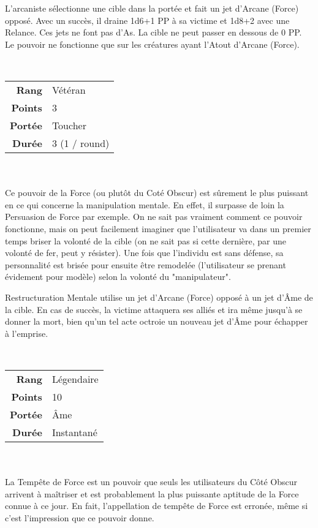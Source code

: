 \begin{description}[align=left]
        L’arcaniste sélectionne une cible dans la portée et fait un jet d’Arcane (Force) opposé. Avec un succès, il draine 1d6+1 PP à sa victime et 1d8+2 avec une Relance. Ces jets ne font pas d’As. La cible ne peut passer en dessous de 0 PP. Le pouvoir ne fonctionne que sur les créatures ayant l’Atout d’Arcane (Force).
        \\

    \item [Restructuration Mentale] ~ \\

        \begin{tabular}{ r l }
            \textbf{Rang}    & Vétéran \\
            \textbf{Points}  & 3 \\
            \textbf{Portée}  & Toucher \\
            \textbf{Durée}   & 3 (1 / round) \\
        \end{tabular}
        \\ \\
        Ce pouvoir de la Force (ou plutôt du Coté Obscur) est sûrement le plus puissant en ce qui concerne la manipulation mentale. En effet, il surpasse de loin la Persuasion de Force par exemple. On ne sait pas vraiment comment ce pouvoir fonctionne, mais on peut facilement imaginer que l’utilisateur va dans un premier temps briser la volonté de la cible (on ne sait pas si cette dernière, par une volonté de fer, peut y résister). Une fois que l’individu est sans défense, sa personnalité est brisée pour ensuite être remodelée (l’utilisateur se prenant évidement pour modèle) selon la volonté du "manipulateur". 

        Restructuration Mentale utilise un jet d’Arcane (Force) opposé à un jet d’\^Ame de la cible. En cas de succès, la victime attaquera ses alliés et ira même jusqu’à se donner la mort, bien qu’un tel acte octroie un nouveau jet d’\^Ame pour échapper à l’emprise.
        \\

    \newpage
    \item [Tempête de Force] ~ \\

        \begin{tabular}{ r l }
            \textbf{Rang}    & Légendaire \\
            \textbf{Points}  & 10 \\
            \textbf{Portée}  & \^Ame \\
            \textbf{Durée}   & Instantané \\
        \end{tabular}
        \\ \\
        La Tempête de Force est un pouvoir que seuls les utilisateurs du Côté Obscur arrivent à maîtriser et est probablement la plus puissante aptitude de la Force connue à ce jour. En fait, l’appellation de tempête de Force est erronée, même si c’est l’impression que ce pouvoir donne. 


\end{description}
